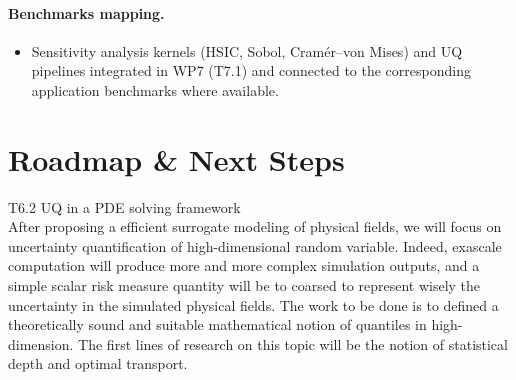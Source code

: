 \paragraph{Benchmarks mapping.}
\begin{itemize}
	\item Sensitivity analysis kernels (HSIC, Sobol, Cramér–von Mises) and UQ pipelines integrated in WP7 (T7.1) and connected to the corresponding application benchmarks where available.
\end{itemize}



\section{Roadmap \& Next Steps}

T6.2 UQ in a PDE solving framework \\ 
After proposing a efficient surrogate modeling of physical fields, we will focus on uncertainty quantification of high-dimensional random variable. Indeed, exascale computation will produce more and more complex simulation outputs, and a simple scalar risk measure quantity will be to coarsed to represent wisely the uncertainty in the simulated physical fields. The work to be done is to defined a theoretically sound and suitable mathematical notion of quantiles in high-dimension. The first lines of research on this topic will be the notion of statistical depth and optimal transport. 


